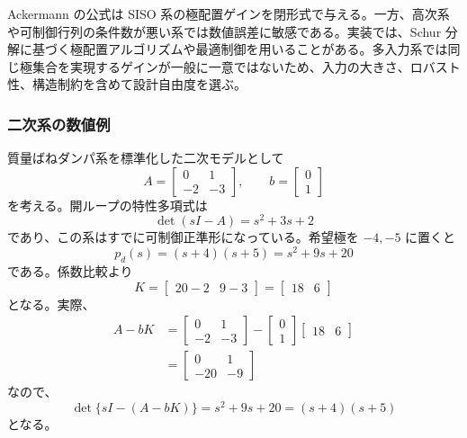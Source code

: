 Ackermann の公式は SISO 系の極配置ゲインを閉形式で与える。一方、高次系や可制御行列の条件数が悪い系では数値誤差に敏感である。実装では、Schur 分解に基づく極配置アルゴリズムや最適制御を用いることがある。多入力系では同じ極集合を実現するゲインが一般に一意ではないため、入力の大きさ、ロバスト性、構造制約を含めて設計自由度を選ぶ。

\subsubsection{二次系の数値例}

質量ばねダンパ系を標準化した二次モデルとして
\begin{equation}
  A=\begin{bmatrix}0&1\\-2&-3\end{bmatrix},\qquad
  b=\begin{bmatrix}0\\1\end{bmatrix}
\end{equation}
を考える。開ループの特性多項式は
\begin{equation}
  \det(sI-A)=s^2+3s+2
\end{equation}
であり、この系はすでに可制御正準形になっている。希望極を $-4,-5$ に置くと
\begin{equation}
  p_d(s)=(s+4)(s+5)=s^2+9s+20
\end{equation}
である。係数比較より
\begin{equation}
  K=\begin{bmatrix}20-2&9-3\end{bmatrix}
   =\begin{bmatrix}18&6\end{bmatrix}
\end{equation}
となる。実際、
\begin{align}
  A-bK
  &=\begin{bmatrix}0&1\\-2&-3\end{bmatrix}
    -\begin{bmatrix}0\\1\end{bmatrix}
     \begin{bmatrix}18&6\end{bmatrix}\\
  &=\begin{bmatrix}0&1\\-20&-9\end{bmatrix}
\end{align}
なので、
\begin{equation}
  \det\{sI-(A-bK)\}=s^2+9s+20=(s+4)(s+5)
\end{equation}
となる。

